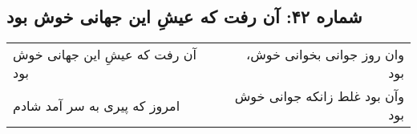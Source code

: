 \begin{center}
\section*{شماره ۴۲: آن رفت که عیشِ این جهانی خوش بود}
\label{sec:042}
\begin{longtable}{l p{0.5cm} r}
آن رفت که عیشِ این جهانی خوش بود
&&
وان روز جوانی بخوانی خوش، بود
\\
امروز که پیری به سر آمد شادم
&&
وآن بود غلط زانکه جوانی خوش بود
\\
\end{longtable}
\end{center}
